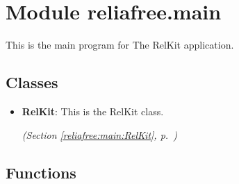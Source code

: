 %
%
%


\section{Module reliafree.main}

    \label{reliafree:main}
This is the main program for The RelKit application.



\subsection{Classes}

\begin{itemize}  \setlength{\parskip}{0ex}
  \item \textbf{RelKit}: This is the RelKit class.



  \textit{(Section \ref{reliafree:main:RelKit}, p.~\pageref{reliafree:main:RelKit})}

\end{itemize}


  \subsection{Functions}

    \label{reliafree:main:main}

    \vspace{0.5ex}

